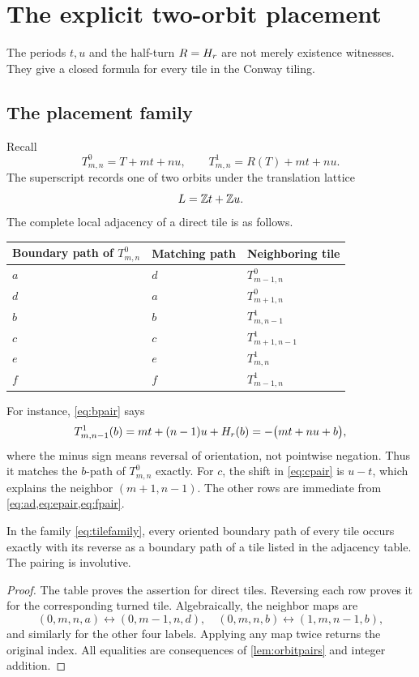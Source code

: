 \section{The explicit two-orbit placement}
\label{sec:orbit}

The periods \(t,u\) and the half-turn \(R=H_{r}\) are not merely existence witnesses.  They give a closed formula for every tile in the Conway tiling.

\subsection{The placement family}

Recall
\[
 T^0_{m,n}=T+mt+nu,
 \qquad
 T^1_{m,n}=R(T)+mt+nu.
\]
The superscript records one of two orbits under the translation lattice
\[
 L=\mathbb Z t+\mathbb Z u.
\]
The complete local adjacency of a direct tile is as follows.

\begin{center}
\begin{tabular}{@{}lll@{}}
\toprule
Boundary path of \(T^0_{m,n}\) & Matching path & Neighboring tile \\
\midrule
\(a\) & \(d\) & \(T^0_{m-1,n}\) \\
\(d\) & \(a\) & \(T^0_{m+1,n}\) \\
\(b\) & \(b\) & \(T^1_{m,n-1}\) \\
\(c\) & \(c\) & \(T^1_{m+1,n-1}\) \\
\(e\) & \(e\) & \(T^1_{m,n}\) \\
\(f\) & \(f\) & \(T^1_{m-1,n}\) \\
\bottomrule
\end{tabular}
\end{center}

For instance, \cref{eq:bpair} says
\[
 T^1_{m,n-1}(b)
 =mt+(n-1)u+H_{r}(b)
 =-\bigl(mt+nu+b\bigr),
\]
where the minus sign means reversal of orientation, not pointwise negation.  Thus it matches the \(b\)-path of \(T^0_{m,n}\) exactly.  For \(c\), the shift in \cref{eq:cpair} is \(u-t\), which explains the neighbor \((m+1,n-1)\).  The other rows are immediate from \cref{eq:ad,eq:epair,eq:fpair}.

\begin{proposition}
\label{prop:edgepaired}
In the family \cref{eq:tilefamily}, every oriented boundary path of every tile occurs exactly with its reverse as a boundary path of a tile listed in the adjacency table.  The pairing is involutive.
\end{proposition}
\begin{proof}
The table proves the assertion for direct tiles.  Reversing each row proves it for the corresponding turned tile.  Algebraically, the neighbor maps are
\[
 (0,m,n,a)\leftrightarrow(0,m-1,n,d),
 \quad
 (0,m,n,b)\leftrightarrow(1,m,n-1,b),
\]
and similarly for the other four labels.  Applying any map twice returns the original index.  All equalities are consequences of \cref{lem:orbitpairs} and integer addition.
\end{proof}

